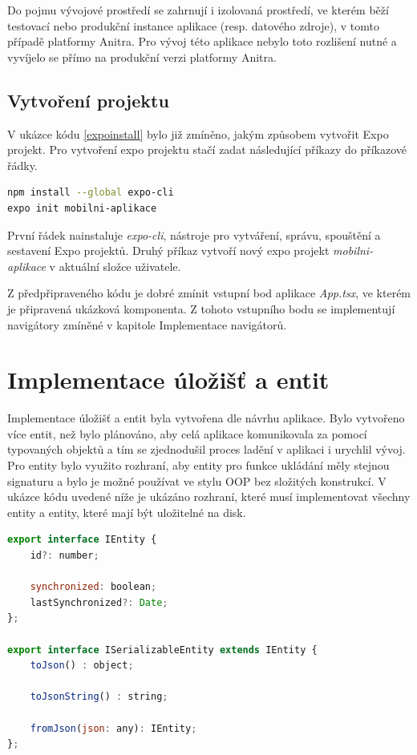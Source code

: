 Do pojmu vývojové prostředí se zahrnují i izolovaná prostředí, ve kterém běží testovací nebo produkční instance aplikace (resp. datového zdroje), v tomto případě platformy Anitra. Pro vývoj této aplikace nebylo toto rozlišení nutné a vyvíjelo se přímo na produkční verzi platformy Anitra.

\subsection{Vytvoření projektu}

V ukázce kódu \ref{expoinstall} bylo již zmíněno, jakým způsobem vytvořit Expo projekt. Pro vytvoření expo projektu stačí zadat následující příkazy do příkazové řádky.

\begin{lstlisting}[language=Bash, caption=Vytvoření nového projektu]
npm install --global expo-cli
expo init mobilni-aplikace
\end{lstlisting}

První řádek nainstaluje \emph{expo-cli}, nástroje pro vytváření, správu, spouštění a sestavení Expo projektů. Druhý příkaz vytvoří nový expo projekt \emph{mobilni-aplikace} v aktuální složce uživatele.

Z předpřipraveného kódu je dobré zmínit vstupní bod aplikace \emph{App.tsx}, ve kterém je připravená ukázková komponenta. Z tohoto vstupního bodu se implementují navigátory zmíněné v kapitole Implementace navigátorů.

\section{Implementace úložišť a entit}

Implementace úložišť a entit byla vytvořena dle návrhu aplikace. Bylo vytvořeno více entit, než bylo plánováno, aby celá aplikace komunikovala za pomocí typovaných objektů a tím se zjednodušil proces ladění v aplikaci i urychlil vývoj. Pro entity bylo využito rozhraní, aby entity pro funkce ukládání měly stejnou signaturu a bylo je možné používat ve stylu OOP bez složitých konstrukcí. V ukázce kódu uvedené níže je ukázáno rozhraní, které musí implementovat všechny entity a entity, které mají být uložitelné na disk.

\begin{lstlisting}[language=JavaScript, caption=Ukázka entity]
export interface IEntity {
	id?: number;
	
	synchronized: boolean;
	lastSynchronized?: Date;
};

export interface ISerializableEntity extends IEntity {
	toJson() : object;
	
	toJsonString() : string;
	
	fromJson(json: any): IEntity;
};
\end{lstlisting}

